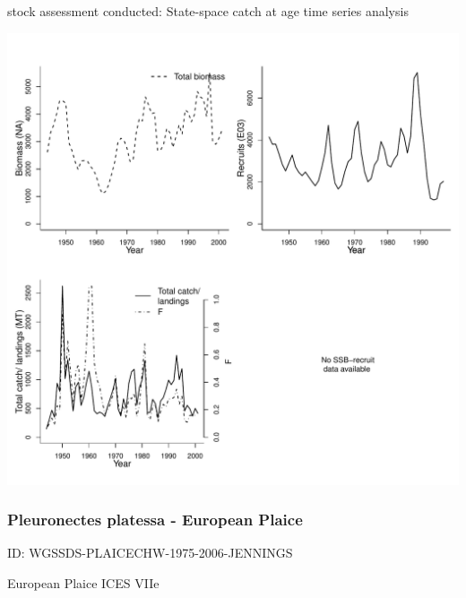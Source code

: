 stock assessment conducted: State-space catch at age time series analysis 
\begin{center}
\vspace{-0.2cm}\includegraphics[scale=0.65]{../tex/figures/plot-DFO-PAC-ESOLEHS-1944-2001-COLLIE.pdf}
\end{center}

\newpage
\subsubsection{Pleuronectes platessa - European Plaice}
ID: WGSSDS-PLAICECHW-1975-2006-JENNINGS

European Plaice ICES VIIe 

